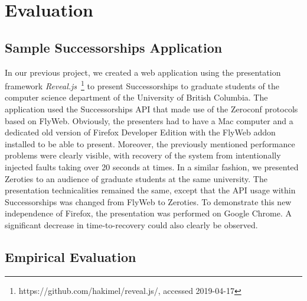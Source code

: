 \section{Evaluation}
\label{sec:evaluation}

\subsection{Sample Successorships Application}

In our previous project, we created a web application using the presentation framework \textit{Reveal.js}~\footnote{https://github.com/hakimel/reveal.js/, accessed 2019-04-17} to present Successorships to graduate students of the computer science department of the University of British Columbia.
The application used the Successorships API that made use of the Zeroconf protocols based on FlyWeb.
Obviously, the presenters had to have a Mac computer and a dedicated old version of Firefox Developer Edition with the FlyWeb addon installed to be able to present.
Moreover, the previously mentioned performance problems were clearly visible, with recovery of the system from intentionally injected faults taking over 20 seconds at times.
In a similar fashion, we presented Zeroties to an audience of graduate students at the same university.
The presentation technicalities remained the same, except that the API usage within Successorships was changed from FlyWeb to Zeroties.
To demonstrate this new independence of Firefox, the presentation was performed on Google Chrome.
A significant decrease in time-to-recovery could also clearly be observed.

\subsection{Empirical Evaluation}
